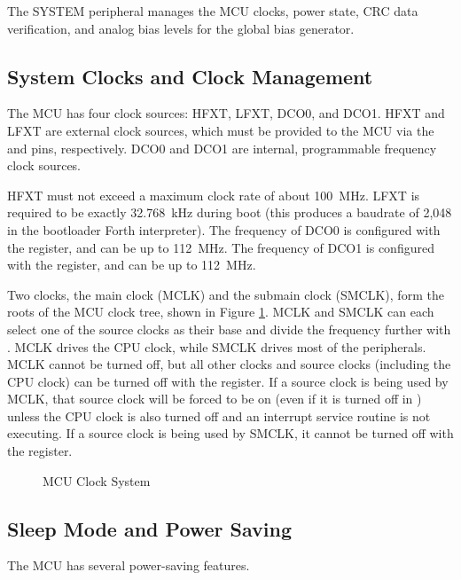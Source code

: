 The SYSTEM peripheral manages the MCU clocks, power state, CRC data verification, and analog bias levels for the global bias generator.

\subsection{System Clocks and Clock Management} \label{ss:clocks}
The MCU has four clock sources: HFXT, LFXT, DCO0, and DCO1. HFXT and LFXT are external clock sources, which must be provided to the MCU via the  and  pins, respectively. DCO0 and DCO1 are internal, programmable frequency clock sources.

HFXT must not exceed a maximum clock rate of about 100~\si{\mega\hertz}. LFXT is required to be exactly 32.768~\si{\kilo\hertz} during boot (this produces a baudrate of 2,048 in the bootloader Forth interpreter). The frequency of DCO0 is configured with the  register, and can be up to 112~\si{\mega\hertz}. The frequency of DCO1 is configured with the  register, and can be up to 112~\si{\mega\hertz}.

Two clocks, the main clock (MCLK) and the submain clock (SMCLK), form the roots of the MCU clock tree, shown in Figure \ref{fig:mcu-clock-system}. MCLK and SMCLK can each select one of the source clocks as their base and divide the frequency further with . MCLK drives the CPU clock, while SMCLK drives most of the peripherals. MCLK cannot be turned off, but all other clocks and source clocks (including the CPU clock) can be turned off with the  register. If a source clock is being used by MCLK, that source clock will be forced to be on (even if it is turned off in ) unless the CPU clock is also turned off and an interrupt service routine is not executing. If a source clock is being used by SMCLK, it cannot be turned off  with the  register.

\begin{figure}[htpb]
	
	\caption{MCU Clock System}
	\label{fig:mcu-clock-system}
\end{figure}

\subsection{Sleep Mode and Power Saving} \label{ss:sleep}
The MCU has several power-saving features.

